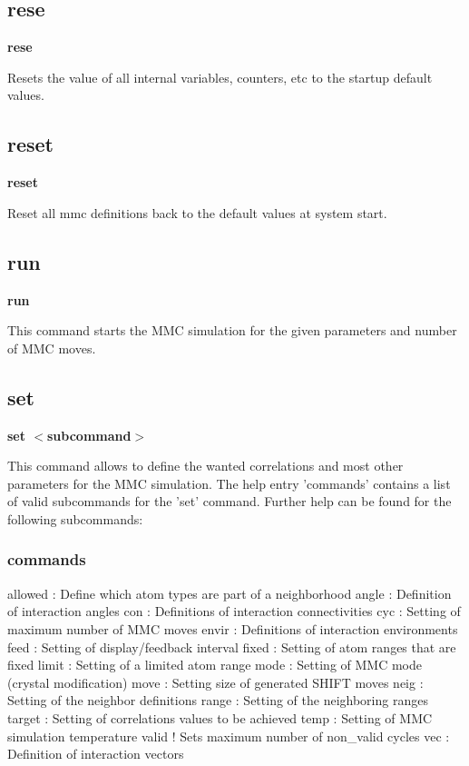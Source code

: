 \subsection*{rese}
{\bf rese \par }
\par
\vspace{3pt}
Resets the value of all internal variables, counters, etc to the 
startup default values. 
\subsection*{reset}
{\bf reset \par }
\par
\vspace{3pt}
Reset all mmc definitions back to the default values at 
system start. 
\subsection*{run}
{\bf run \par }
\par
\vspace{3pt}
This command starts the MMC simulation for the given parameters and 
number of MMC moves. 
\subsection*{set}
{\bf set $ <$subcommand$> $ \par }
\par
\vspace{3pt}
This command allows to define the wanted correlations and most other 
parameters for the MMC simulation. The help entry 'commands' contains 
a list of valid subcommands for the 'set' command. Further help can 
be found for the following subcommands: 
\par
\subsubsection{commands}
\begin{MacVerbatim}
allowed : Define which atom types are part of a neighborhood
angle   : Definition of interaction angles
con     : Definitions of interaction connectivities
cyc     : Setting of maximum number of MMC moves
envir   : Definitions of interaction environments
feed    : Setting of display/feedback interval
fixed   : Setting of atom ranges that are fixed
limit   : Setting of a limited atom range
mode    : Setting of MMC mode (crystal modification)
move    : Setting size of generated SHIFT moves
neig    : Setting of the neighbor definitions
range   : Setting of the neighboring ranges
target  : Setting of correlations values to be achieved
temp    : Setting of MMC simulation temperature
valid   ! Sets maximum number of non_valid cycles
vec     : Definition of interaction vectors
\end{MacVerbatim}
